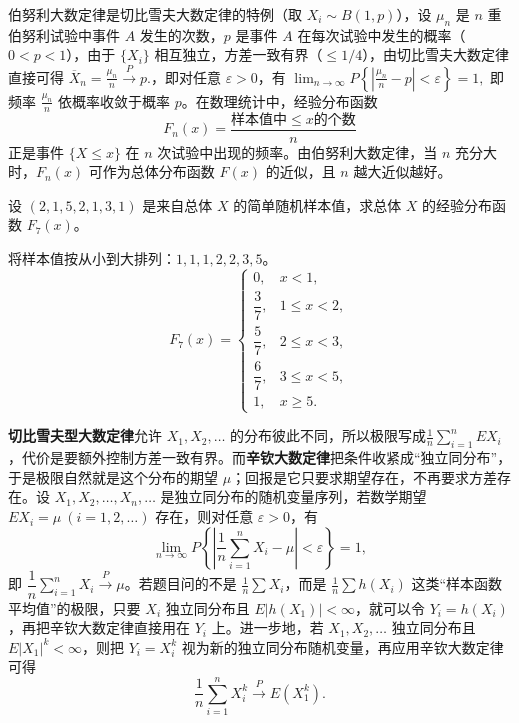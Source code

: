 \documentclass[lang=cn,11pt]{elegantbook}
\begin{document}
\begin{theorem}[伯努利大数定律] \label{thm:bernoulli-lln}
伯努利大数定律是切比雪夫大数定律的特例（取 \(X_i \sim B(1,p)\)），设 \(\mu_n\) 是 \(n\) 重伯努利试验中事件 \(A\) 发生的次数，\(p\) 是事件 \(A\) 在每次试验中发生的概率（\(0 < p < 1\)），由于 \(\{X_i\}\) 相互独立，方差一致有界（\(\leq 1/4\)），由切比雪夫大数定律直接可得
\(
\overline{X}_n = \frac{\mu_n}{n} \xrightarrow{P} p.
\)，即对任意 \(\varepsilon > 0\)，有
\(
\lim_{n\to\infty} P\!\left\{\left|\frac{\mu_n}{n} - p\right| < \varepsilon\right\} = 1,
\)
即频率 \(\frac{\mu_n}{n}\) 依概率收敛于概率 \(p\)。在数理统计中，经验分布函数
\[
F_n(x) = \frac{\text{样本值中} \leq x \text{的个数}}{n}
\]
正是事件 \(\{X \leq x\}\) 在 \(n\) 次试验中出现的频率。由伯努利大数定律，当 \(n\) 充分大时，\(F_n(x)\) 可作为总体分布函数 \(F(x)\) 的近似，且 \(n\) 越大近似越好。
\end{theorem}

\begin{exercise}\label{exer:5-empirical}
设 \((2, 1, 5, 2, 1, 3, 1)\) 是来自总体 \(X\) 的简单随机样本值，求总体 \(X\) 的经验分布函数 \(F_7(x)\)。
\end{exercise}

\begin{solution}
将样本值按从小到大排列：\(1, 1, 1, 2, 2, 3, 5\)。
\[
F_7(x) = \begin{cases}
0, & x < 1, \\
\dfrac{3}{7}, & 1 \leq x < 2, \\
\dfrac{5}{7}, & 2 \leq x < 3, \\
\dfrac{6}{7}, & 3 \leq x < 5, \\
1, & x \geq 5.
\end{cases}
\]
\end{solution}


\begin{theorem}[辛钦大数定律] \label{thm:khinchin-lln}
\textbf{切比雪夫型大数定律}允许 \(X_1,X_2,\dots\) 的分布彼此不同，所以极限写成\(\frac1n\sum_{i=1}^n EX_i\)，代价是要额外控制方差一致有界。而\textbf{辛钦大数定律}把条件收紧成“独立同分布”，于是极限自然就是这个分布的期望 \(\mu\)；回报是它只要求期望存在，不再要求方差存在。设 \(X_1, X_2, \dots, X_n, \dots\) 是独立同分布的随机变量序列，若数学期望 \(EX_i = \mu\ (i = 1, 2, \dots)\) 存在，则对任意 \(\varepsilon > 0\)，有
\[
\lim_{n\to\infty} P\!\left\{\left|\frac{1}{n}\sum_{i=1}^{n} X_i - \mu\right| < \varepsilon\right\} = 1,
\]
即 \(\dfrac{1}{n}\displaystyle\sum_{i=1}^{n} X_i \stackrel{P}{\longrightarrow} \mu\)。若题目问的不是 \(\frac1n\sum X_i\)，而是
\(
\frac1n\sum h(X_i)
\)
这类“样本函数平均值”的极限，只要 \(X_i\) 独立同分布且 \(E|h(X_1)|<\infty\)，就可以令 \(Y_i=h(X_i)\)，再把辛钦大数定律直接用在 \(Y_i\) 上。进一步地，若 \(X_1, X_2, \dots\) 独立同分布且 \(E|X_1|^k<\infty\)，则把 \(Y_i=X_i^k\) 视为新的独立同分布随机变量，再应用辛钦大数定律可得
\[
\frac{1}{n}\sum_{i=1}^{n} X_i^k \stackrel{P}{\longrightarrow} E(X_1^k).
\]
\end{theorem}
\end{document}
